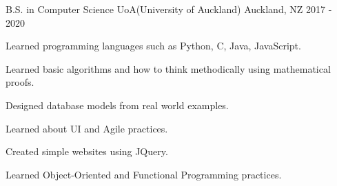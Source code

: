 

\begin{cventries}

  \cventry
    {B.S. in Computer Science} %
    {UoA(University of Auckland)} %
    {Auckland, NZ} %
    {2017 - 2020} %
    {
      \begin{cvitems} %
        \item {Learned programming languages such as Python, C, Java, JavaScript.}
        \item {Learned basic algorithms and how to think methodically using mathematical proofs.}
        \item {Designed database models from real world examples.}
        \item {Learned about UI and Agile practices.}
        \item {Created simple websites using JQuery.}
        \item {Learned Object-Oriented and Functional Programming practices.}
      \end{cvitems}
    }

\end{cventries}
